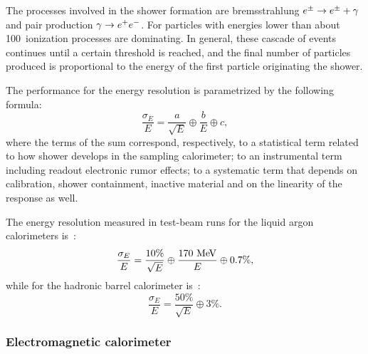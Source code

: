 The processes involved in the shower formation are bremsstrahlung $\epm \to \epm + \gamma$
and pair production $\gamma \to \epem$. For particles with energies lower than about
100\mev\ ionization processes are dominating. In general, these cascade of events
continues until a certain threshold is reached, and the final number of particles
produced is proportional to the energy of the first particle originating the shower.


The performance for the energy resolution is parametrized by the following formula:
\begin{equation}\label{eq:resolution}
\frac{\sigma_{E}}{E} = \frac{a}{\sqrt{E}}\oplus\frac{b}{E}\oplus c,
\end{equation} 
where the terms of the sum correspond, respectively, to a statistical term related to how shower develops in the sampling calorimeter; to an instrumental
term including readout electronic rumor effects; to a systematic term that depends on calibration, shower containment, inactive material and on the
linearity of the response as well. 


The energy resolution measured in test-beam runs for the liquid argon calorimeters is~\cite{lar_readiness}:
\begin{equation}
\frac{\sigma_{E}}{E}=\frac{10\%}{\sqrt{E}} \oplus\frac{170\MeV}{E} \oplus 0.7\%,
\end{equation}
while for the hadronic barrel calorimeter is~\cite{tile_readiness}:
\begin{equation}
\frac{\sigma_{E}}{E}=\frac{50\%}{\sqrt{E}} \oplus 3\%.
\end{equation}



\subsubsection{Electromagnetic calorimeter}\label{sec:emcalbarrel}

